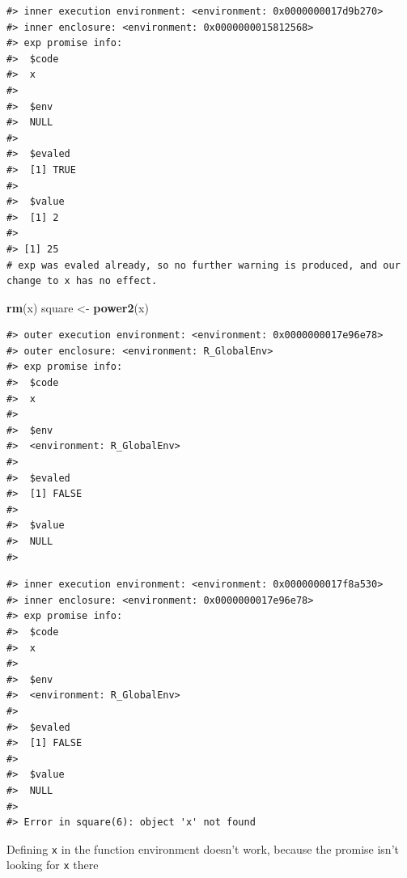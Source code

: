 \documentclass[]{book}
\newenvironment{Shaded}{\begin{snugshade}}{\end{snugshade}}
\newcommand{\CommentTok}[1]{\textcolor[rgb]{0.56,0.35,0.01}{\textit{#1}}}
\newcommand{\ControlFlowTok}[1]{\textcolor[rgb]{0.13,0.29,0.53}{\textbf{#1}}}
\newcommand{\DecValTok}[1]{\textcolor[rgb]{0.00,0.00,0.81}{#1}}
\newcommand{\KeywordTok}[1]{\textcolor[rgb]{0.13,0.29,0.53}{\textbf{#1}}}
\newcommand{\NormalTok}[1]{#1}
\newcommand{\OperatorTok}[1]{\textcolor[rgb]{0.81,0.36,0.00}{\textbf{#1}}}
\newcommand{\StringTok}[1]{\textcolor[rgb]{0.31,0.60,0.02}{#1}}
\begin{document}
\begin{verbatim}
#> inner execution environment: <environment: 0x0000000017d9b270>
#> inner enclosure: <environment: 0x0000000015812568>
#> exp promise info: 
#>  $code
#>  x
#>  
#>  $env
#>  NULL
#>  
#>  $evaled
#>  [1] TRUE
#>  
#>  $value
#>  [1] 2
#>  
#> [1] 25
# exp was evaled already, so no further warning is produced, and our change to x has no effect.
\end{verbatim}

\begin{Shaded}
\begin{Highlighting}[]
\KeywordTok{rm}\NormalTok{(x)}
\NormalTok{square <-}\StringTok{ }\KeywordTok{power2}\NormalTok{(x)}
\end{Highlighting}
\end{Shaded}

\begin{verbatim}
#> outer execution environment: <environment: 0x0000000017e96e78>
#> outer enclosure: <environment: R_GlobalEnv>
#> exp promise info: 
#>  $code
#>  x
#>  
#>  $env
#>  <environment: R_GlobalEnv>
#>  
#>  $evaled
#>  [1] FALSE
#>  
#>  $value
#>  NULL
#>  
\end{verbatim}

\begin{Shaded}
\end{Shaded}

\begin{verbatim}
#> inner execution environment: <environment: 0x0000000017f8a530>
#> inner enclosure: <environment: 0x0000000017e96e78>
#> exp promise info: 
#>  $code
#>  x
#>  
#>  $env
#>  <environment: R_GlobalEnv>
#>  
#>  $evaled
#>  [1] FALSE
#>  
#>  $value
#>  NULL
#>  
#> Error in square(6): object 'x' not found
\end{verbatim}

Defining \texttt{x} in the function environment doesn't work, because the promise isn't looking for \texttt{x} there

\begin{Shaded}
\end{Shaded}
\end{document}
